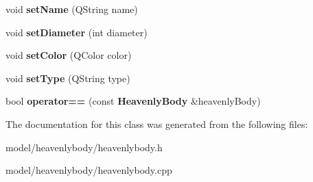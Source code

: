 \begin{DoxyCompactItemize}
\item 
void {\bfseries set\-Name} (\-Q\-String name)\label{d0/dd5/classHeavenlyBody_af15530ccfc1016f258ce0017b1b1efd6}

\item 
void {\bfseries set\-Diameter} (int diameter)\label{d0/dd5/classHeavenlyBody_a1b2df4229d1a826edf039655bca1eec9}

\item 
void {\bfseries set\-Color} (\-Q\-Color color)\label{d0/dd5/classHeavenlyBody_a896c8c85515b934b1e28c8197796d3ad}

\item 
void {\bfseries set\-Type} (\-Q\-String type)\label{d0/dd5/classHeavenlyBody_a9c13e363532d2befcc5bd0324772b423}

\item 
bool {\bfseries operator==} (const {\bf \-Heavenly\-Body} \&heavenly\-Body)\label{d0/dd5/classHeavenlyBody_ae6ad0aef9ecf499d65b67c7b916c8408}

\end{DoxyCompactItemize}


\-The documentation for this class was generated from the following files\-:\begin{DoxyCompactItemize}
\item 
model/heavenlybody/heavenlybody.\-h\item 
model/heavenlybody/heavenlybody.\-cpp\end{DoxyCompactItemize}
